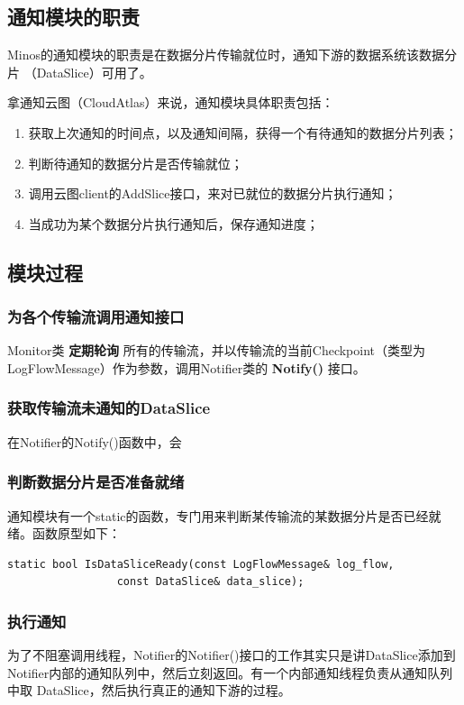 \documentclass[11pt]{article}
\begin{document}
\subsection{通知模块的职责}
\label{sec-4-1}
Minos的通知模块的职责是在数据分片传输就位时，通知下游的数据系统该数据分片
（DataSlice）可用了。

拿通知云图（CloudAtlas）来说，通知模块具体职责包括：
\begin{enumerate}
\item 获取上次通知的时间点，以及通知间隔，获得一个有待通知的数据分片列表；
\item 判断待通知的数据分片是否传输就位；
\item 调用云图client的AddSlice接口，来对已就位的数据分片执行通知；
\item 当成功为某个数据分片执行通知后，保存通知进度；
\end{enumerate}
\subsection{模块过程}
\label{sec-4-2}
\subsubsection{为各个传输流调用通知接口}
\label{sec-4-2-1}
Monitor类 \textbf{定期轮询} 所有的传输流，并以传输流的当前Checkpoint（类型为
LogFlowMessage）作为参数，调用Notifier类的 \textbf{Notify()} 接口。
\subsubsection{获取传输流未通知的DataSlice}
\label{sec-4-2-2}
在Notifier的Notify()函数中，会
\subsubsection{判断数据分片是否准备就绪}
\label{sec-4-2-3}
通知模块有一个static的函数，专门用来判断某传输流的某数据分片是否已经就绪。函数原型如下：

\begin{verbatim}
static bool IsDataSliceReady(const LogFlowMessage& log_flow,
			     const DataSlice& data_slice);
\end{verbatim}
\subsubsection{执行通知}
\label{sec-4-2-4}
为了不阻塞调用线程，Notifier的Notifier()接口的工作其实只是讲DataSlice添加到
Notifier内部的通知队列中，然后立刻返回。有一个内部通知线程负责从通知队列中取
DataSlice，然后执行真正的通知下游的过程。
\end{document}
